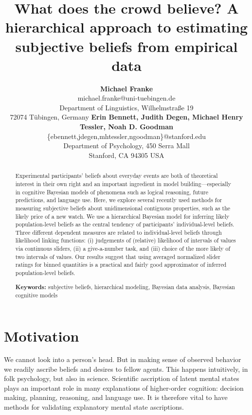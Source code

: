 \documentclass[10pt,letterpaper]{article}
\title{What does the crowd believe? A hierarchical approach to estimating subjective beliefs
  from empirical data}
\author{{\large \bf Michael Franke} \\
  michael.franke@uni-tuebingen.de \\
  Department of Linguistics, Wilhelmstra\ss e 19 \\
 72074 T\"{u}bingen, Germany \AND 
 {\large \bf Erin Bennett, Judith Degen, Michael Henry Tessler, Noah D. Goodman}\\
     \{ebennett,jdegen,mhtessler,ngoodman\}@stanford.edu \\
     Department of Psychology, 450 Serra Mall \\
  Stanford, CA 94305 USA }
\begin{document}
\maketitle

\begin{abstract}
  Experimental participants' beliefs about everyday events are both of theoretical interest in their own right and an important ingredient in model building---especially in cognitive Bayesian models of
  phenomena such as logical reasoning, future predictions, and language use. Here, we explore
  several recently used methods for measuring subjective beliefs about unidimensional
  contiguous properties, such as the likely price of a new watch. We use a hierarchical
  Bayesian model for inferring likely population-level beliefs as the central tendency of
  participants' individual-level beliefs.  Three different dependent measures are related to
  individual-level beliefs through likelihood linking functions: (i) judgements of
  (relative) likelihood of intervals of values via continuous sliders, (ii) a give-a-number
  task, and (iii) choice of the more likely of two intervals of values. Our results suggest
  that using averaged normalized slider ratings for binned quantities is a practical and fairly
  good approximator of inferred population-level beliefs.

  \textbf{Keywords:} subjective beliefs, hierarchical modeling, Bayesian data analysis,
  Bayesian cognitive models
\end{abstract}




\section{Motivation}

We cannot look into a person's head. But in making sense of observed behavior we readily
ascribe beliefs and desires to fellow agents. This happens intuitively, in folk psychology, but
also in science. Scientific ascription of latent mental states plays an important role in many
explanations of higher-order cognition: decision making, planning, reasoning, and language
use. It is therefore vital to have methods for validating explanatory mental state
ascriptions.
\end{document}
